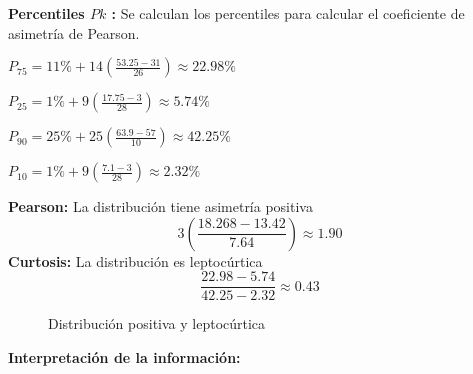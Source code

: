 \vspace{-0.5cm}
\textbf{Percentiles $Pk$ :} Se calculan los percentiles para calcular el coeficiente de asimetría de Pearson.
\begin{multicols}{2}

	$P_{75} = 11\% + 14\left(\frac{53.25 - 31}{26}\right) \approx 22.98\%$

	$P_{25} = 1\% + 9\left(\frac{17.75 - 3}{28}\right) \approx 5.74\%$

	$P_{90} = 25\% + 25\left(\frac{63.9 - 57}{10}\right) \approx 42.25\%$

	$P_{10} = 1\% + 9\left(\frac{7.1 - 3}{28}\right) \approx 2.32\%$
\end{multicols}
\begin{multicols}{2}
	\textbf{Pearson:} La distribución tiene asimetría positiva
	\begin{equation*}
		3\left(\frac{18.268-13.42}{7.64}\right) \approx 1.90
	\end{equation*}
	\textbf{Curtosis:} La distribución es leptocúrtica
	\begin{equation*}
		\frac{22.98-5.74}{42.25-2.32} \approx 0.43
	\end{equation*}
\end{multicols}
\vspace{-0.5cm}
\begin{figure}[H]
	\centering
	\hspace*{-1.2cm}
	\vspace{-0.4cm}
	\caption{Distribución positiva y leptocúrtica}
\end{figure}
\vspace{-0.8cm}
\textbf{Interpretación de la información:}

